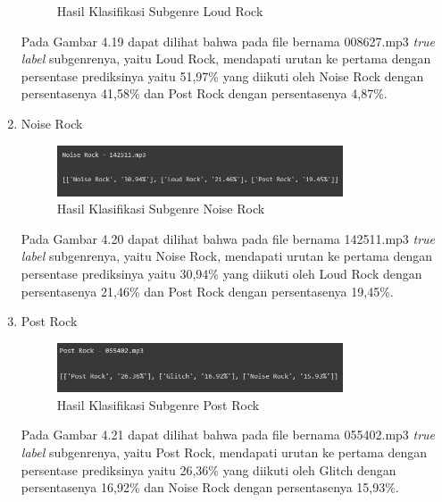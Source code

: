 \begin{enumerate}
\begin{figure}[H]
		\caption{Hasil Klasifikasi Subgenre Loud Rock}
		\label{fig:klas_loudrock}
	\end{figure}
	
	Pada Gambar 4.19 dapat dilihat bahwa pada file bernama 008627.mp3 \emph{true label} subgenrenya, yaitu Loud Rock, mendapati urutan ke pertama dengan persentase prediksinya yaitu 51,97\% yang diikuti oleh Noise Rock dengan persentasenya 41,58\% dan Post Rock dengan persentasenya 4,87\%.
	
	\item Noise Rock
	
	\begin{figure}[H]
		\centering
		
		\includegraphics[width=0.8\textwidth]{gambar/classification_noise rock}
		
		\caption{Hasil Klasifikasi Subgenre Noise Rock}
		\label{fig:klas_noiserock}
	\end{figure}
	
	Pada Gambar 4.20 dapat dilihat bahwa pada file bernama 142511.mp3 \emph{true label} subgenrenya, yaitu Noise Rock, mendapati urutan ke pertama dengan persentase prediksinya yaitu 30,94\% yang diikuti oleh Loud Rock dengan persentasenya 21,46\% dan Post Rock dengan persentasenya 19,45\%.
	
	\item Post Rock
	
	\begin{figure}[H]
		\centering
		
		\includegraphics[width=0.8\textwidth]{gambar/classification_post rock}
		
		\caption{Hasil Klasifikasi Subgenre Post Rock}
		\label{fig:klas_postrock}
	\end{figure}
	
	Pada Gambar 4.21 dapat dilihat bahwa pada file bernama 055402.mp3 \emph{true label} subgenrenya, yaitu Post Rock, mendapati urutan ke pertama dengan persentase prediksinya yaitu 26,36\% yang diikuti oleh Glitch dengan persentasenya 16,92\% dan Noise Rock dengan persentasenya 15,93\%.
	
\end{enumerate}

